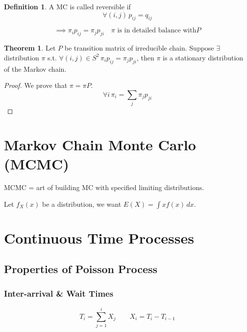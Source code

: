 \documentclass{article}
\theoremstyle{definition}
\newtheorem{defn}{Definition}[section]
\newtheorem{theorem}{Theorem}[section]
\begin{document}
\begin{defn}
A MC is called reversible if 
$$
\forall (i,j) \, p_{ij} = q_{ij}
$$
\end{defn}

$$
\implies \pi_i p_{ij} = \pi_j p_{ji} \quad \pi \text{ is in detailed balance with} P
$$

\begin{theorem}
Let $P$ be transition matrix of irreducible chain. Suppose $\exists$ distribution $\pi$ s.t. $\forall (i,j) \in S^2 \, \pi_i p_{ij} = \pi_j p_{ji}$,
then $\pi$ is a stationary distribution of the Markov chain. 

\begin{proof}
We prove that $\pi = \pi P$. 
$$
\forall i \, \pi_i = \sum_j \pi_j p_{ji}
$$

\end{proof}
\end{theorem}

\section{Markov Chain Monte Carlo (MCMC)}
MCMC = art of building MC with specified limiting distributions.

Let $f_X(x)$ be a distribution, we want $E(X) = \int x f(x) \, dx$. 

\section{Continuous Time Processes}

\subsection{Properties of Poisson Process}

\subsubsection{Inter-arrival & Wait Times}

$$
T_i = \sum_{j=1}^i X_j \qquad X_i = T_i - T_{i-1}
$$
\end{document}
